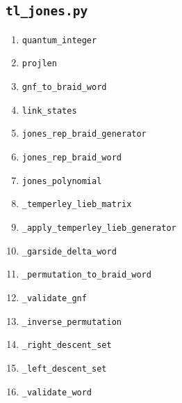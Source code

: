 ﻿\documentclass[10pt]{article}
\begin{document}
\subsection{\texttt{tl\_jones.py}}
\begin{enumerate}
  \item \texttt{quantum\_integer}
  \item \texttt{projlen}
  \item \texttt{gnf\_to\_braid\_word}
  \item \texttt{link\_states}
  \item \texttt{jones\_rep\_braid\_generator}
  \item \texttt{jones\_rep\_braid\_word}
  \item \texttt{jones\_polynomial}
  \item \texttt{\_temperley\_lieb\_matrix}
  \item \texttt{\_apply\_temperley\_lieb\_generator}
  \item \texttt{\_garside\_delta\_word}
  \item \texttt{\_permutation\_to\_braid\_word}
  \item \texttt{\_validate\_gnf}
  \item \texttt{\_inverse\_permutation}
  \item \texttt{\_right\_descent\_set}
  \item \texttt{\_left\_descent\_set}
  \item \texttt{\_validate\_word}
\end{enumerate}
\end{document}
